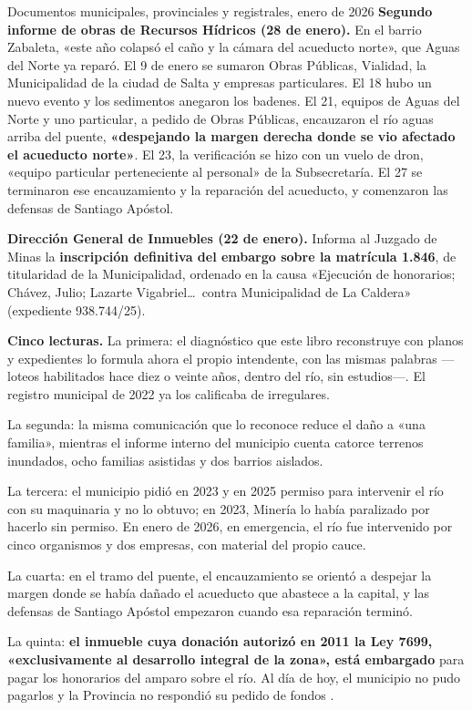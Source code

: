 \begin{ficha}{Documentos municipales, provinciales y registrales, enero de 2026}
\textbf{Segundo informe de obras de Recursos Hídricos (28 de enero).} En el barrio Zabaleta, «este año colapsó el caño y la cámara del acueducto norte», que Aguas del Norte ya reparó. El 9 de enero se sumaron Obras Públicas, Vialidad, la Municipalidad de la ciudad de Salta y empresas particulares. El 18 hubo un nuevo evento y los sedimentos anegaron los badenes. El 21, equipos de Aguas del Norte y uno particular, a pedido de Obras Públicas, encauzaron el río aguas arriba del puente, \textbf{«despejando la margen derecha donde se vio afectado el acueducto norte»}. El 23, la verificación se hizo con un vuelo de dron, «equipo particular perteneciente al personal» de la Subsecretaría. El 27 se terminaron ese encauzamiento y la reparación del acueducto, y comenzaron las defensas de Santiago Apóstol.

\textbf{Dirección General de Inmuebles (22 de enero).} Informa al Juzgado de Minas la \textbf{inscripción definitiva del embargo sobre la matrícula 1.846}, de titularidad de la Municipalidad, ordenado en la causa «Ejecución de honorarios; Chávez, Julio; Lazarte Vigabriel\ldots\ contra Municipalidad de La Caldera» (expediente 938.744/25).
\end{ficha}

\begin{cautela}
\textbf{Cinco lecturas.} La primera: el diagnóstico que este libro reconstruye con planos y expedientes lo formula ahora el propio intendente, con las mismas palabras ---loteos habilitados hace diez o veinte años, dentro del río, sin estudios---. El registro municipal de 2022 ya los calificaba de irregulares.

La segunda: la misma comunicación que lo reconoce reduce el daño a «una familia», mientras el informe interno del municipio cuenta catorce terrenos inundados, ocho familias asistidas y dos barrios aislados.

La tercera: el municipio pidió en 2023 y en 2025 permiso para intervenir el río con su maquinaria y no lo obtuvo; en 2023, Minería lo había paralizado por hacerlo sin permiso. En enero de 2026, en emergencia, el río fue intervenido por cinco organismos y dos empresas, con material del propio cauce.

La cuarta: en el tramo del puente, el encauzamiento se orientó a despejar la margen donde se había dañado el acueducto que abastece a la capital, y las defensas de Santiago Apóstol empezaron cuando esa reparación terminó.

La quinta: \textbf{el inmueble cuya donación autorizó en 2011 la Ley 7699, «exclusivamente al desarrollo integral de la zona», está embargado} para pagar los honorarios del amparo sobre el río. Al día de hoy, el municipio no pudo pagarlos y la Provincia no respondió su pedido de fondos .
\end{cautela}

